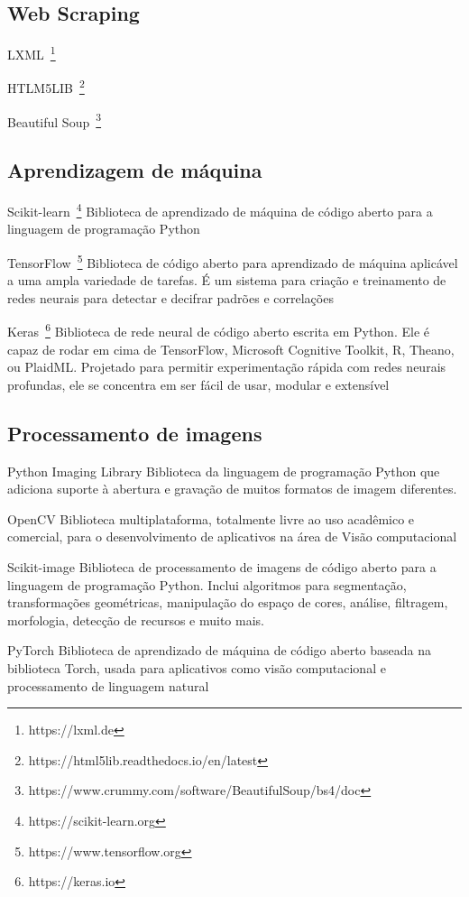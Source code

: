 \subsection{Web Scraping}

LXML~\footnote{https://lxml.de}

HTLM5LIB~\footnote{https://html5lib.readthedocs.io/en/latest}

Beautiful Soup~\footnote{https://www.crummy.com/software/BeautifulSoup/bs4/doc}

\subsection{Aprendizagem de máquina}

Scikit-learn~\footnote{https://scikit-learn.org}
Biblioteca de aprendizado de máquina de código aberto para a linguagem de programação Python

TensorFlow~\footnote{https://www.tensorflow.org}
Biblioteca de código aberto para aprendizado de máquina aplicável a uma ampla variedade de tarefas. 
É um sistema para criação e treinamento de redes neurais para detectar e decifrar padrões e correlações

Keras~\footnote{https://keras.io}
Biblioteca de rede neural de código aberto escrita em Python. 
Ele é capaz de rodar em cima de TensorFlow, Microsoft Cognitive Toolkit, R, Theano, ou PlaidML. 
Projetado para permitir experimentação rápida com redes neurais profundas, ele se concentra em ser fácil de usar, modular e extensível

\subsection{Processamento de imagens}

Python Imaging Library
Biblioteca da linguagem de programação Python que adiciona suporte à abertura e gravação de muitos formatos de imagem diferentes.

OpenCV
Biblioteca multiplataforma, totalmente livre ao uso acadêmico e comercial, para o desenvolvimento de aplicativos na área de Visão computacional

Scikit-image
Biblioteca de processamento de imagens de código aberto para a linguagem de programação Python. Inclui algoritmos para segmentação, transformações geométricas, manipulação do espaço de cores, análise, filtragem, morfologia, detecção de recursos e muito mais.

PyTorch
Biblioteca de aprendizado de máquina de código aberto baseada na biblioteca Torch, usada para aplicativos como visão computacional e processamento de linguagem natural
